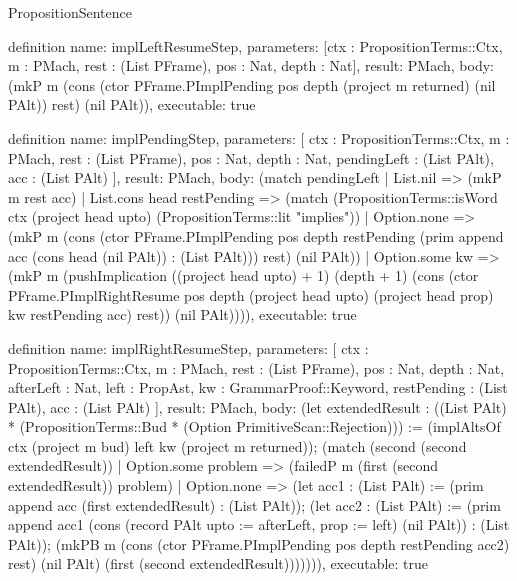 \begin{lexlean}{PropositionSentence}
\begin{semanticmodule}
definition{
  name: implLeftResumeStep,
  parameters: [ctx : PropositionTerms::Ctx, m : PMach, rest : (List PFrame), pos : Nat, depth : Nat],
  result: PMach,
  body: (mkP m (cons (ctor PFrame.PImplPending pos depth (project m returned) (nil PAlt)) rest) (nil PAlt)),
  executable: true
}

definition{
  name: implPendingStep,
  parameters: [
    ctx : PropositionTerms::Ctx,
    m : PMach,
    rest : (List PFrame),
    pos : Nat,
    depth : Nat,
    pendingLeft : (List PAlt),
    acc : (List PAlt)
  ],
  result: PMach,
  body: (match pendingLeft
    | List.nil => (mkP m rest acc)
    | List.cons head restPending => (match (PropositionTerms::isWord ctx (project head upto) (PropositionTerms::lit "implies"))
        | Option.none => (mkP m (cons (ctor PFrame.PImplPending pos depth restPending (prim append acc (cons head (nil PAlt)) : (List PAlt))) rest) (nil PAlt))
        | Option.some kw => (mkP m (pushImplication ((project head upto) + 1) (depth + 1) (cons (ctor PFrame.PImplRightResume pos depth (project head upto) (project head prop) kw restPending acc) rest)) (nil PAlt)))),
  executable: true
}

definition{
  name: implRightResumeStep,
  parameters: [
    ctx : PropositionTerms::Ctx,
    m : PMach,
    rest : (List PFrame),
    pos : Nat,
    depth : Nat,
    afterLeft : Nat,
    left : PropAst,
    kw : GrammarProof::Keyword,
    restPending : (List PAlt),
    acc : (List PAlt)
  ],
  result: PMach,
  body: (let extendedResult : ((List PAlt) * (PropositionTerms::Bud * (Option PrimitiveScan::Rejection))) := (implAltsOf ctx (project m bud) left kw (project m returned)); (match (second (second extendedResult))
    | Option.some problem => (failedP m (first (second extendedResult)) problem)
    | Option.none => (let acc1 : (List PAlt) := (prim append acc (first extendedResult) : (List PAlt)); (let acc2 : (List PAlt) := (prim append acc1 (cons (record PAlt {upto := afterLeft, prop := left}) (nil PAlt)) : (List PAlt)); (mkPB m (cons (ctor PFrame.PImplPending pos depth restPending acc2) rest) (nil PAlt) (first (second extendedResult))))))),
  executable: true
}


\end{semanticmodule}
\end{lexlean}
